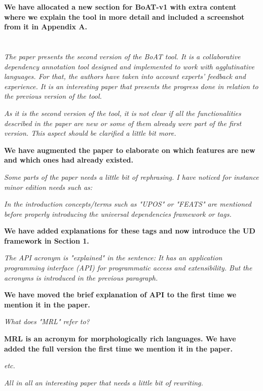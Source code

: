 \documentclass[final,2p]{article}
\newcommand{\comment}{\emph}
\newcommand{\response}{\noindent \textbf}
\begin{document}
\response{We have allocated a new section for BoAT-v1 with extra content where we explain the tool in more detail and included a screenshot from it in Appendix A.}

\section*{}

\comment{The paper presents the second version of the BoAT tool. It is a collaborative dependency annotation tool designed and implemented to work with agglutinative languages. For that, the authors have taken into account experts' feedback and experience. It is an interesting paper that presents the progress done in relation to the previous version of the tool.}

\comment{As it is the second version of the tool, it is not clear if all the functionalities described in the paper are new or some of them already were part of the first version. This aspect should be clarified a little bit more.}

\response{We have augmented the paper to elaborate on which features are new and which ones had already existed.}

\comment{Some parts of the paper needs a little bit of rephrasing. I have noticed for instance minor edition needs such as:}

\comment{In the introduction concepts/terms such as "UPOS" or "FEATS" are mentioned before properly introducing the universal dependencies framework or tags.}

\response{We have added explanations for these tags and now introduce the UD framework in Section 1.}

\comment{The API acronym is "explained" in the sentence: It has an application programming interface (API) for programmatic access and extensibility. But the acronyms is introduced in the previous paragraph.}

\response{We have moved the brief explanation of API to the first time we mention it in the paper.}

\comment{What does "MRL" refer to?}

\response{MRL is an acronym for morphologically rich languages. We have added the full version the first time we mention it in the paper.}

\comment{etc.}

\comment{All in all an interesting paper that needs a little bit of rewriting.}
\end{document}
